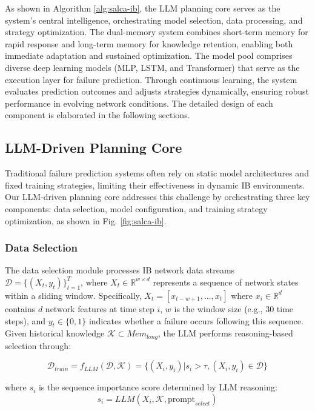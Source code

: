 \documentclass[conference]{IEEEtran}
\begin{document}
As shown in Algorithm \ref{alg:salca-ib}, the LLM planning core serves as the system's central intelligence, orchestrating model selection, data processing, and strategy optimization. The dual-memory system combines short-term memory for rapid response and long-term memory for knowledge retention, enabling both immediate adaptation and sustained optimization. The model pool comprises diverse deep learning models (MLP, LSTM, and Transformer) that serve as the execution layer for failure prediction. Through continuous learning, the system evaluates prediction outcomes and adjusts strategies dynamically, ensuring robust performance in evolving network conditions. The detailed design of each component is elaborated in the following sections.

\subsection{LLM-Driven Planning Core}
Traditional failure prediction systems often rely on static model architectures and fixed training strategies, limiting their effectiveness in dynamic IB environments. Our LLM-driven planning core addresses this challenge by orchestrating three key components: data selection, model configuration, and training strategy optimization, as shown in Fig. \ref{fig:salca-ib}.

\subsubsection{Data Selection}
The data selection module processes IB network data streams $\mathcal{D} = \{(X_t, y_t)\}_{t=1}^T$, where $X_t \in \mathbb{R}^{w \times d}$ represents a sequence of network states within a sliding window. Specifically, $X_t = [x_{t-w+1}, ..., x_t]$ where $x_i \in \mathbb{R}^d$ contains $d$ network features at time step $i$, $w$ is the window size (e.g., 30 time steps), and $y_t \in \{0,1\}$ indicates whether a failure occurs following this sequence. Given historical knowledge $\mathcal{K} \subset Mem_{long}$, the LLM performs reasoning-based selection through:

\begin{equation}
    \mathcal{D}_{train} = f_{LLM}(\mathcal{D}, \mathcal{K}) = \{(X_i, y_i) | s_i > \tau, (X_i, y_i) \in \mathcal{D}\}
\end{equation}

where $s_i$ is the sequence importance score determined by LLM reasoning:
\begin{equation}
    s_i = LLM(X_i, \mathcal{K}, \text{prompt}_{select})
\end{equation}
\end{document}

